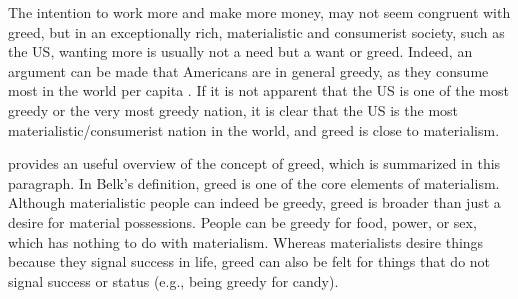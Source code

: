 \documentclass[10pt, letterpaper]{article}
\begin{document}
\begin{spacing}{1.8}
The intention to work more and make more money, may not seem congruent with
greed, but in an exceptionally rich, materialistic and consumerist society, such as the US, wanting more is usually not a need
but a want or greed. Indeed, an argument can be made that Americans are in general greedy, as they consume most in the world per capita \citep{leonard10,kasser13}.
%
If it is not apparent that the US is one of the most greedy or the very most greedy nation, it is clear that the US is the most materialistic/consumerist nation in the world, and greed is close to materialism.

\citet{seuntjens15b} provides an useful overview of the concept of greed, which
is summarized in this paragraph. In Belk's  definition, greed is one of the core elements of materialism. Although materialistic people can indeed be greedy, greed is broader than just a desire for material possessions. People can be greedy for food, power, or sex, which has nothing to do with materialism. Whereas materialists desire things because they signal success in life, greed can also be felt for things that do not signal success or status (e.g., being greedy for candy).



\end{spacing}
\end{document}
